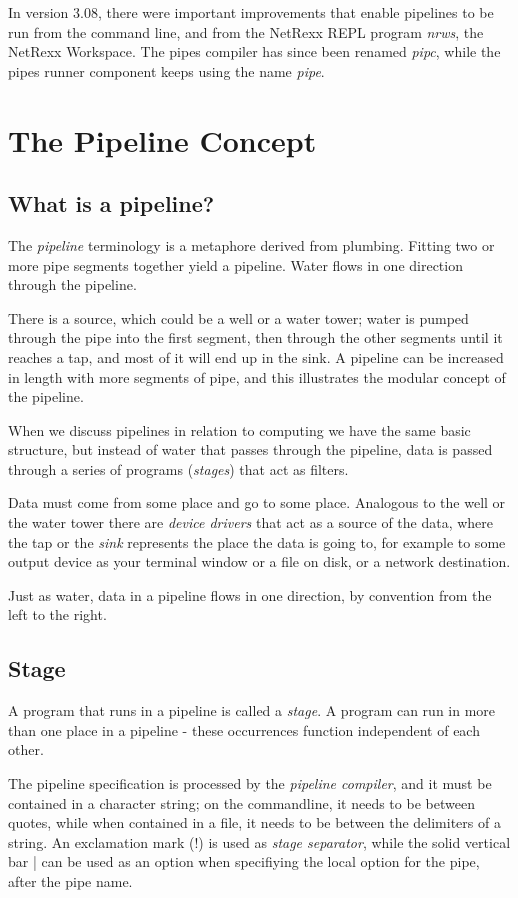 In version 3.08, there were
important improvements that enable pipelines to be run from the
command line, and from the NetRexx REPL program \emph{nrws}, the
NetRexx Workspace. The pipes compiler has since been renamed
\emph{pipc}, while the pipes runner component keeps using the name \emph{pipe}.

\chapter{The Pipeline Concept}
\section{What is a pipeline?}
The \emph{pipeline} terminology is a metaphore derived from
plumbing. Fitting two or more pipe segments together yield a
pipeline. Water flows in one direction through the pipeline.

There is a source, which could be a well or a water tower; water is
pumped through the pipe into the first segment, then through the other
segments until it reaches a tap, and most of it will end up in the
sink. A pipeline can be increased in length with more segments of
pipe, and this illustrates the modular concept of the pipeline.

When we discuss pipelines in relation to computing we have the same
basic structure, but instead of water that passes through the
pipeline, data is passed through a series of programs (\emph{stages})
that act as filters.

Data must come from some place and go to some place. Analogous to the
well or the water tower there are \emph{device drivers} that act as a
source of the data, where the tap or the \emph{sink} represents the place the
data is going to, for example to some output device as your terminal
window or a file on disk, or a network destination.

Just as water, data in a pipeline flows in one direction, by
convention from the left to the right.
\section{Stage}
A program that runs in a pipeline is called a \emph{stage}. A program
can run in more than one place in a pipeline - these occurrences
function independent of each other. 

The pipeline specification is processed by the \emph{pipeline
  compiler}, and it must be contained in a character string; on the
commandline, it needs to be between quotes, while when contained in a
file, it needs to be between the delimiters of a \nr{} string. An
exclamation mark (!) is used as \emph{stage separator}, while the
solid vertical bar | can be used as an option when specifiying the
local option for the pipe, after the pipe name.

